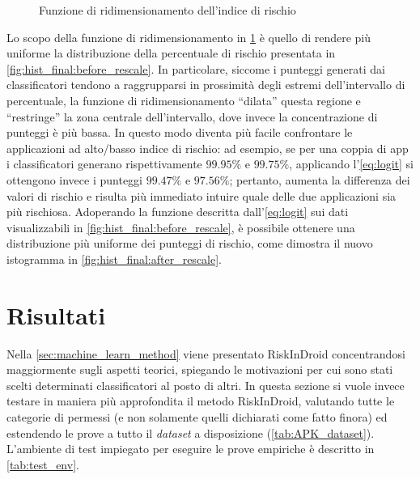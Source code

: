 \documentclass[12pt,a4paper,oneside]{article}
\begin{document}
\begin{figure}[!htb]
    \centering
    \caption{Funzione di ridimensionamento dell'indice di rischio}\label{fig:logit}
\end{figure}

\noindent Lo scopo della funzione di ridimensionamento in \cref{fig:logit} è quello di rendere più uniforme la distribuzione della percentuale di rischio presentata in \cref{fig:hist_final:before_rescale}. In particolare, siccome i punteggi generati dai classificatori tendono a raggrupparsi in prossimità degli estremi dell'intervallo di percentuale, la funzione di ridimensionamento ``dilata'' questa regione e ``restringe'' la zona centrale dell'intervallo, dove invece la concentrazione di punteggi è più bassa. In questo modo diventa più facile confrontare le applicazioni ad alto/basso indice di rischio: ad esempio, se per una coppia di app i classificatori generano rispettivamente $99.95\%$ e $99.75\%$, applicando l'\cref{eq:logit} si ottengono invece i punteggi $99.47\%$ e $97.56\%$; pertanto, aumenta la differenza dei valori di rischio e risulta più immediato intuire quale delle due applicazioni sia più rischiosa. Adoperando la funzione descritta dall'\cref{eq:logit} sui dati visualizzabili in \cref{fig:hist_final:before_rescale}, è possibile ottenere una distribuzione più uniforme dei punteggi di rischio, come dimostra il nuovo istogramma in \cref{fig:hist_final:after_rescale}.
\newpage





\section{Risultati}\label{sec:Risultati}

Nella \cref{sec:machine_learn_method} viene presentato RiskInDroid concentrandosi maggiormente sugli aspetti teorici, spiegando le motivazioni per cui sono stati scelti determinati classificatori al posto di altri. In questa sezione si vuole invece testare in maniera più approfondita il metodo RiskInDroid, valutando tutte le categorie di permessi (e non solamente quelli dichiarati come fatto finora) ed estendendo le prove a tutto il \textit{dataset} a disposizione (\cref{tab:APK_dataset}). L'ambiente di test impiegato per eseguire le prove empiriche è descritto in \cref{tab:test_env}.
\end{document}
